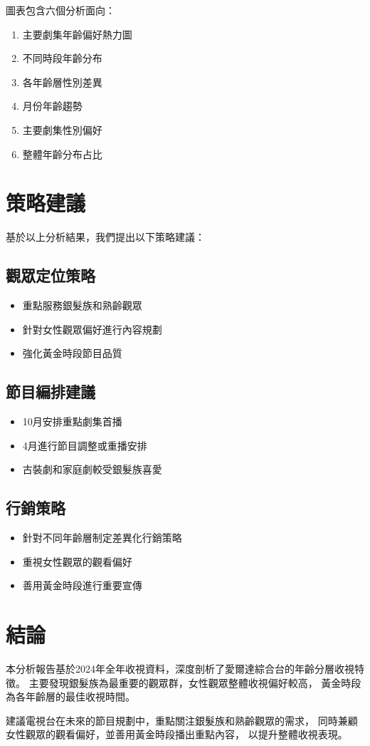 \documentclass[12pt,a4paper]{article}
\begin{document}
圖表包含六個分析面向：
\begin{enumerate}
    \item 主要劇集年齡偏好熱力圖
    \item 不同時段年齡分布
    \item 各年齡層性別差異
    \item 月份年齡趨勢
    \item 主要劇集性別偏好
    \item 整體年齡分布占比
\end{enumerate}

\section{策略建議}

基於以上分析結果，我們提出以下策略建議：

\subsection{觀眾定位策略}
\begin{itemize}
    \item 重點服務銀髮族和熟齡觀眾
    \item 針對女性觀眾偏好進行內容規劃
    \item 強化黃金時段節目品質
\end{itemize}

\subsection{節目編排建議}
\begin{itemize}
    \item 10月安排重點劇集首播
    \item 4月進行節目調整或重播安排
    \item 古裝劇和家庭劇較受銀髮族喜愛
\end{itemize}

\subsection{行銷策略}
\begin{itemize}
    \item 針對不同年齡層制定差異化行銷策略
    \item 重視女性觀眾的觀看偏好
    \item 善用黃金時段進行重要宣傳
\end{itemize}

\section{結論}

本分析報告基於2024年全年收視資料，深度剖析了愛爾達綜合台的年齡分層收視特徵。
主要發現銀髮族為最重要的觀眾群，女性觀眾整體收視偏好較高，
黃金時段為各年齡層的最佳收視時間。

建議電視台在未來的節目規劃中，重點關注銀髮族和熟齡觀眾的需求，
同時兼顧女性觀眾的觀看偏好，並善用黃金時段播出重點內容，
以提升整體收視表現。
\end{document}
